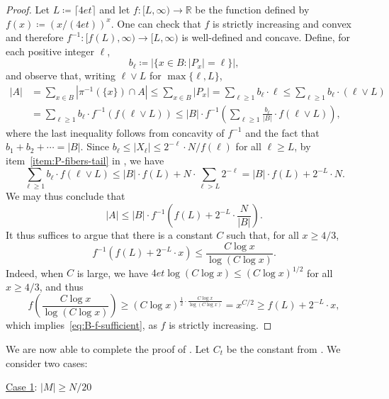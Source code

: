 \documentclass[11pt,a4paper,oneside,reqno]{amsart}
\begin{document}
\begin{proof}
  Let $L \coloneqq \lceil 4et \rceil$ and let $f \colon [L, \infty) \to \mathbb{R}$ be the function defined by $f(x) \coloneqq (x/(4et))^x$.  One can check that $f$ is strictly increasing and convex and therefore $f^{-1} \colon [f(L), \infty) \to [L, \infty)$ is well-defined and concave.
  Define, for each positive integer $\ell$,
  \[
    b_\ell \coloneqq |\{x \in B : |P_x| = \ell\}|,
  \]
  and observe that, writing $\ell \vee L$ for $\max\{\ell, L\}$,
  \[
    \begin{split}
      |A|
      & = \sum_{x \in B} |\pi^{-1}(\{x\}) \cap A| \le \sum_{x \in B} |P_x| = \sum_{\ell \ge 1}b_\ell\cdot \ell \le \sum_{\ell \ge 1} b_\ell \cdot (\ell \vee L) \\
      & = \sum_{\ell \ge 1} b_\ell \cdot f^{-1}(f(\ell \vee L)) \le |B| \cdot f^{-1}\left( \sum_{\ell \ge 1} \frac{b_\ell}{|B|} \cdot f(\ell \vee L)\right),
    \end{split}
  \]
  where the last inequality follows from concavity of $f^{-1}$ and the fact that $b_1 + b_2 + \dotsb = |B|$.
  Since $b_{\ell}\leq |X_{\ell}|\leq 2^{-\ell} \cdot N / f(\ell)$ for all $\ell\geq L$, by item~\ref{item:P-fibers-tail} in , we have
  \[
    \sum_{\ell \ge 1} b_\ell \cdot f(\ell \vee L) \le |B| \cdot f(L) + N \cdot \sum_{\ell > L} 2^{-\ell} = |B| \cdot f(L) + 2^{-L} \cdot N.
  \]
  We may thus conclude that
  \[
    |A| \le |B| \cdot f^{-1}\left(f(L) + 2^{-L} \cdot \frac{N}{|B|}\right).
  \]
  It thus suffices to argue that there is a constant $C$ such that, for all $x \ge 4/3$,
  \begin{equation}
    \label{eq:B-f-sufficient}
    f^{-1} \left( f(L) + 2^{-L} \cdot x \right) \le \frac{ C\log x}{\log (C\log x)}.
  \end{equation}
  Indeed, when $C$ is large, we have $4et \log (C \log x) \le (C \log x)^{1/2}$ for all $x \ge 4/3$, and thus
  \[
    f\left(\frac{ C\log x}{\log (C\log x)}\right) \ge \left(C \log x\right)^{\frac{1}{2} \cdot \frac{C \log x}{\log (C \log x)}} = x^{C/2} \ge f(L) + 2^{-L} \cdot x,
  \]
  which implies~\eqref{eq:B-f-sufficient}, as $f$ is strictly increasing.
\end{proof}

We are now able to complete the proof of .
Let $C_t$ be the constant from .
We consider two cases:


\vspace{0.2cm}

\noindent \underline{Case 1}: $|M| \ge N / 20$
\end{document}
